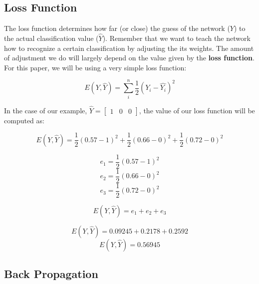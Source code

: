 \documentclass[a4paper]{article}
\begin{document}
\subsection{Loss Function}

The loss function determines how far (or close) the guess of the network ($Y$) to the actual classification value ($\widehat{Y}$). Remember that we want to teach the network how to recognize a certain classification by adjusting the its weights. The amount of adjustment we do will largely depend on the value given by the \textbf{loss function}. For this paper, we will be using a very simple loss function:

\begin{equation}
  E(Y, \widehat{Y})=\sum_{i}^{n} {\frac{1}{2}(Y_{i}-\widehat{Y_{i}})^2}
\end{equation}

In the case of our example, $\widehat{Y}=\begin{bmatrix}1 & 0 & 0\end{bmatrix}$, the value of our loss function will be computed as:

\begin{equation}
  E(Y, \widehat{Y})=\frac{1}{2}(0.57 - 1)^2 + \frac{1}{2}(0.66 - 0)^2 + \frac{1}{2}(0.72 - 0)^2
\end{equation}

\begin{equation}
  e_{1} = \frac{1}{2}(0.57 - 1)^2
\end{equation}
\begin{equation}
  e_{2} = \frac{1}{2}(0.66 - 0)^2
\end{equation}
\begin{equation}
  e_{3} = \frac{1}{2}(0.72 - 0)^2
\end{equation}

\begin{equation}
  E(Y, \widehat{Y})=e_{1} + e_{2} + e_{3}
\end{equation}

\begin{equation}
  E(Y, \widehat{Y})=0.09245 + 0.2178 + 0.2592
\end{equation}
\begin{equation}
  E(Y, \widehat{Y})=0.56945
\end{equation}

\subsection{Back Propagation}
\end{document}
